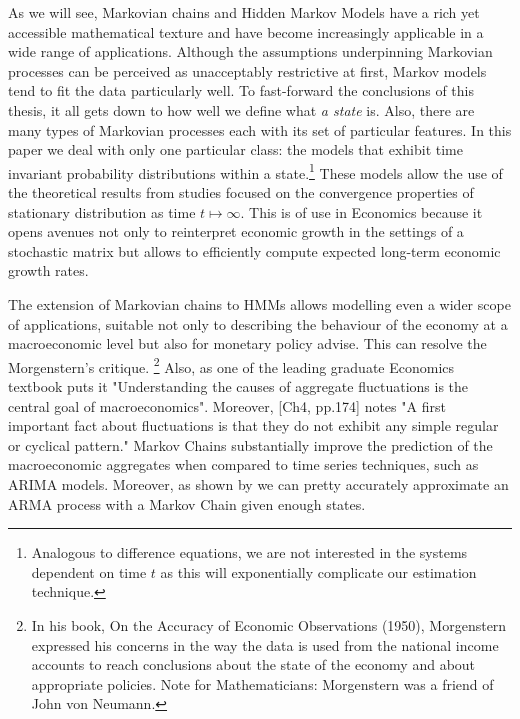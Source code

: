 \documentclass[a4paper,12pt]{article}
\theoremstyle{definition}
\begin{document}
As we will see, Markovian chains and Hidden Markov Models have a rich yet accessible mathematical texture and have become increasingly applicable in a wide range of applications. Although the assumptions underpinning Markovian processes can be perceived as unacceptably restrictive at first, Markov models tend to fit the data particularly well. To fast-forward the conclusions of this thesis, it all gets down to how well we define what \textit{a state} is. Also, there are many types of Markovian processes each with its set of particular features. In this paper we deal with only one particular class: the models that exhibit time invariant probability distributions within a state.\footnote{Analogous to difference equations, we are not interested in the systems dependent on time $t$ as this will exponentially complicate our estimation technique.} These models allow the use of the theoretical results from studies focused on the convergence properties of stationary  distribution as time $t \mapsto \infty$. This is of use in Economics because it opens avenues not only to reinterpret economic growth in the settings of a stochastic matrix but allows to efficiently compute expected long-term economic growth rates.  

The extension of Markovian chains to HMMs allows modelling even a wider scope of applications, suitable not only to describing the behaviour of the economy at a macroeconomic level but also for monetary policy advise. This can resolve the Morgenstern's critique. \footnote{In his book, On the Accuracy of Economic Observations (1950), Morgenstern expressed his concerns in the way the data is used from the national income accounts to reach conclusions about the state of the economy and about appropriate policies. Note for Mathematicians: Morgenstern was a friend of John von Neumann.} Also, as one of the leading graduate Economics textbook puts it "Understanding the causes of aggregate fluctuations is the central goal of macroeconomics"\cite{Romer06}. Moreover, \cite{Romer06}[Ch4, pp.174] notes "A first important fact about fluctuations is that they do not exhibit any simple regular or cyclical pattern." Markov Chains substantially improve the prediction of the macroeconomic aggregates when compared to time series techniques, such as ARIMA models. Moreover, as shown by \cite{Tauchen86} we can pretty accurately approximate an ARMA process with a Markov Chain given enough states.
\end{document}
